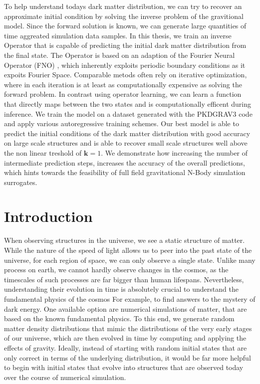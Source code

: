 \documentclass{article}
\begin{document}
To help understand todays dark matter distribution, we can try to recover an approximate initial condition by solving the inverse problem of the gravitional model. Since the forward solution is known, we can generate large quantities of time aggreated simulation data samples. In this thesis, we train an inverse Operator that is capable of predicting the initial dark matter distribution from the final state. The Operator is based on an adaption of the Fourier Neural Operator (FNO) \citep{li2020fourier}, which inherently exploits periodic boundary conditions as it expoits Fourier Space. Comparable metods often rely on iterative optimization, where in each iteration is at least as computationally expensive as solving the forward problem. In contrast using operator learning, we can learn a function that directly maps between the two states and is  computationally efficent during inference. We train the model on a dataset generated with the PKDGRAV3 code \citep{potter2017pkdgrav3} and apply various autoregressive training schemes. Our best model is able to predict the initial conditions of the dark matter distribution with good accuracy on large scale structures and is able to recover small scale structures well above the non linear treshold of $\mathbf{k} = 1$. We demonstrate how increasing the number of intermediate prediction steps, increases the accuracy of the overall predictions, which hints towards the feasibility of full field gravitational N-Body simulation surrogates. 
\newpage 

\tableofcontents

\newpage


\section{Introduction}


When observing structures in the universe, we see a static structure of matter. While the nature of the speed of light allows us to peer into the past state of the universe, for each region of space, we can only observe a single state. Unlike many process on earth, we cannot hardly observe changes in the cosmos, as the timescales of such processes are far bigger than human lifespans. Nevertheless, understanding their evolution in time is absolutely crucial to understand the fundamental physics of the cosmos For example, to find answers to the mystery of dark energy. One available option are numerical simulations of matter, that are based on the known fundamental physics. To this end, we generate random matter density distributions that mimic the distributions of the very early stages of our universe, which are then evolved in time by computing and applying the effects of gravity. Ideally, instead of starting with random initial states that are only correct in terms of the underlying distribution, it would be far more helpful to begin with initial states that evolve into structures that are observed today over the course of numerical simulation. 
\end{document}
